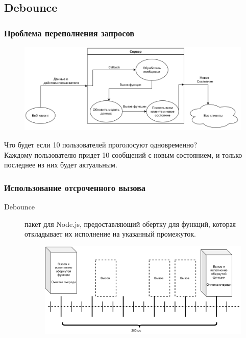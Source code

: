 \documentclass{beamer}
\begin{document}
\subsection{Debounce}
\begin{frame}
\frametitle{Проблема переполнения запросов}
\begin{figure}
	\includegraphics[width=\linewidth]{img/nodeb.png}
\end{figure}
	Что будет если 10 пользователей проголосуют одновременно?\\
	Каждому пользователю придет 10 сообщений с новым состоянием, и только последнее из них будет актуальным.  
\end{frame}

\begin{frame}
\frametitle{Использование отсроченного вызова}
\begin{description}
	\item[Debounce] пакет для Node.js, предоставляющий обертку для функций, которая откладывает их исполнение на указанный промежуток. 
	\centering
	 \begin{figure}
	 	\includegraphics[width=\linewidth]{img/debounce.png}
	 \end{figure}
\end{description}

\end{frame}
\end{document}
